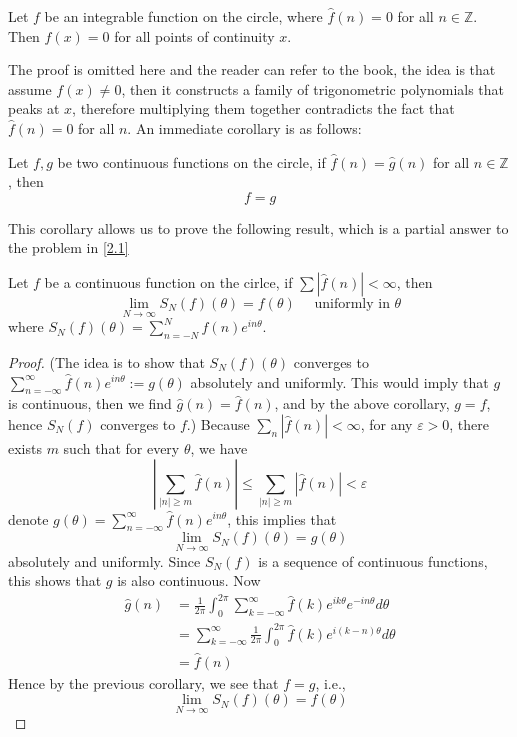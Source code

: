 \begin{thm}
    Let $f$ be an integrable function on the circle, where $\hat{f}(n)=0$ for all $n\in\mathbb{Z}$. Then $f(x)=0$ for all points of continuity $x$. 
\end{thm}
The proof is omitted here and the reader can refer to the book, the idea is that assume $f(x)\neq 0$, then it constructs a family of trigonometric polynomials that peaks at $x$, therefore multiplying them together contradicts the fact that $\hat{f}(n)=0$ for all $n$. An immediate corollary is as follows:
\begin{cor}
    Let $f,g$ be two continuous functions on the circle, if $\hat{f}(n)=\hat{g}(n)$ for all $n\in\mathbb{Z}$, then 
    \begin{equation*}
        f=g
    \end{equation*}
\end{cor}
This corollary allows us to prove the following result, which is a partial answer to the problem in \ref{2.1}
\begin{prop}
    Let $f$ be a continuous function on the cirlce, if $\sum|\hat{f}(n)|<\infty$, then 
    \begin{equation*}
        \lim_{N\to\infty}S_N(f)(\theta)=f(\theta) \quad \text{ uniformly in } \theta 
    \end{equation*}
    where $S_N(f)(\theta)=\sum_{n=-N}^N\hat{f}(n)e^{in\theta}$.
\end{prop}
\begin{proof}
    (The idea is to show that $S_N(f)(\theta)$ converges to $\sum_{n=-\infty}^\infty\hat{f}(n)e^{in\theta}:=g(\theta)$ absolutely and uniformly. This would imply that $g$ is continuous, then we find $\hat{g}(n)=\hat{f}(n)$, and by the above corollary, $g=f$, hence $S_N(f)$ converges to $f$.) Because $\sum_n|\hat{f}(n)|<\infty$, for any $\varepsilon>0$, there exists $m$ such that for every $\theta$, we have 
    \begin{equation*}
        \left|\sum_{|n|\geq m}\hat{f}(n)\right|\leq \sum_{|n|\geq m}|\hat{f}(n)|<\varepsilon
    \end{equation*}
    denote $g(\theta)=\sum_{n=-\infty}^\infty\hat{f}(n)e^{in\theta}$, this implies that 
    \begin{equation*}
        \lim_{N\to\infty}S_N(f)(\theta)=g(\theta)
    \end{equation*}
    absolutely and uniformly. Since $S_N(f)$ is a sequence of continuous functions, this shows that $g$ is also continuous. Now 
    \begin{align*}
        \hat{g}(n)&=\frac{1}{2\pi}\int_{0}^{2\pi}\sum_{k=-\infty}^\infty\hat{f}(k)e^{ik\theta}e^{-in\theta}d\theta\\
        &=\sum_{k=-\infty}^\infty\frac{1}{2\pi}\int_{0}^{2\pi}\hat{f}(k)e^{i(k-n)\theta}d\theta\\
        &=\hat{f}(n)
    \end{align*}
    Hence by the previous corollary, we see that $f=g$, i.e., 
    \begin{equation*}
        \lim_{N\to\infty}S_N(f)(\theta)=f(\theta)
    \end{equation*}
\end{proof}
